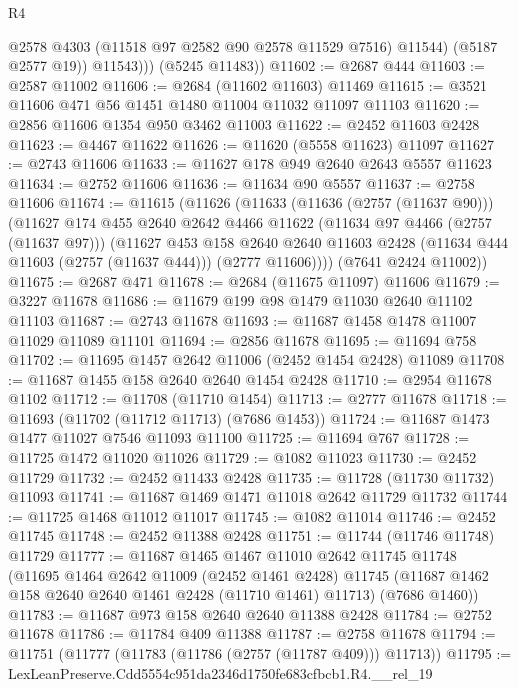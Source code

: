 \begin{lexlean}{R4}
\begin{coremodule}
                @2578
                @4303
                (@11518 @97 @2582 @90 @2578 @11529 @7516)
                @11544)
              (@5187 @2577 @19))
            @11543)))
      (@5245 @11483))
@11602 := @2687 @444
@11603 := @2587 @11002
@11606 := @2684 (@11602 @11603) @11469
@11615 := @3521 @11606 @471 @56 @1451 @1480 @11004 @11032 @11097 @11103
@11620 := @2856 @11606 @1354 @950 @3462 @11003
@11622 := @2452 @11603 @2428
@11623 := @4467 @11622
@11626 := @11620 (@5558 @11623) @11097
@11627 := @2743 @11606
@11633 := @11627 @178 @949 @2640 @2643 @5557 @11623
@11634 := @2752 @11606
@11636 := @11634 @90 @5557
@11637 := @2758 @11606
@11674 := @11615
    (@11626
      (@11633
        (@11636 (@2757 (@11637 @90)))
        (@11627
          @174
          @455
          @2640
          @2642
          @4466
          @11622
          (@11634 @97 @4466 (@2757 (@11637 @97)))
          (@11627
            @453
            @158
            @2640
            @2640
            @11603
            @2428
            (@11634 @444 @11603 (@2757 (@11637 @444)))
            (@2777 @11606))))
      (@7641 @2424 @11002))
@11675 := @2687 @471
@11678 := @2684 (@11675 @11097) @11606
@11679 := @3227 @11678
@11686 := @11679 @199 @98 @1479 @11030 @2640 @11102 @11103
@11687 := @2743 @11678
@11693 := @11687 @1458 @1478 @11007 @11029 @11089 @11101
@11694 := @2856 @11678
@11695 := @11694 @758
@11702 := @11695 @1457 @2642 @11006 (@2452 @1454 @2428) @11089
@11708 := @11687 @1455 @158 @2640 @2640 @1454 @2428
@11710 := @2954 @11678 @1102
@11712 := @11708 (@11710 @1454)
@11713 := @2777 @11678
@11718 := @11693 (@11702 (@11712 @11713) (@7686 @1453))
@11724 := @11687 @1473 @1477 @11027 @7546 @11093 @11100
@11725 := @11694 @767
@11728 := @11725 @1472 @11020 @11026
@11729 := @1082 @11023
@11730 := @2452 @11729
@11732 := @2452 @11433 @2428
@11735 := @11728 (@11730 @11732) @11093
@11741 := @11687 @1469 @1471 @11018 @2642 @11729 @11732
@11744 := @11725 @1468 @11012 @11017
@11745 := @1082 @11014
@11746 := @2452 @11745
@11748 := @2452 @11388 @2428
@11751 := @11744 (@11746 @11748) @11729
@11777 := @11687
    @1465
    @1467
    @11010
    @2642
    @11745
    @11748
    (@11695
      @1464
      @2642
      @11009
      (@2452 @1461 @2428)
      @11745
      (@11687 @1462 @158 @2640 @2640 @1461 @2428 (@11710 @1461) @11713)
      (@7686 @1460))
@11783 := @11687 @973 @158 @2640 @2640 @11388 @2428
@11784 := @2752 @11678
@11786 := @11784 @409 @11388
@11787 := @2758 @11678
@11794 := @11751 (@11777 (@11783 (@11786 (@2757 (@11787 @409))) @11713))
@11795 := LexLeanPreserve.Cdd5554c951da2346d1750fe683cfbcb1.R4.__rel_19

\end{coremodule}
\end{lexlean}
